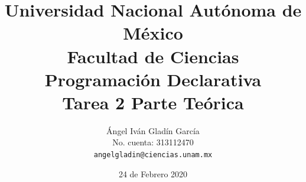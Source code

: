 \documentclass[11pt,letterpaper]{article}
\begin{document}
\title{
        Universidad Nacional Autónoma de México\\
        Facultad de Ciencias\\
        Programación Declarativa\\
    \vspace{.5cm}
    \large
        \textbf{Tarea 2} Parte Teórica
}
\author{
    Ángel Iván Gladín García\\
    No. cuenta: 313112470\\
    \texttt{angelgladin@ciencias.unam.mx}
}
\date{24 de Febrero 2020}
\maketitle

\newtheorem{theorem}{Teorema}
\newtheorem{example}{Ejemplo}
\newtheorem{corollary}{Corolario}
\newtheorem{lemma}{Lemma}
\newtheorem{definition}{Definicion}
\newtheorem{prop}{Proposicion}
\end{document}
